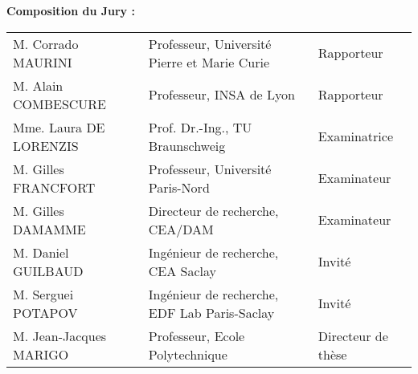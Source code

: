 \begin{titlepage}
\begin{mdframed}
\begin{flushleft}
\textbf{Composition du Jury :}

\vspace{15pt}
\begin{tabular}{@{}lll}
M. Corrado MAURINI & Professeur, Université Pierre et Marie Curie & Rapporteur \\
M. Alain COMBESCURE & Professeur, INSA de Lyon & Rapporteur \\
Mme. Laura DE LORENZIS & Prof. Dr.-Ing., TU Braunschweig & Examinatrice \\
M. Gilles FRANCFORT & Professeur, Université Paris-Nord & Examinateur \\
M. Gilles DAMAMME & Directeur de recherche, CEA/DAM & Examinateur \\
M. Daniel GUILBAUD & Ingénieur de recherche, CEA Saclay & Invité \\
M. Serguei POTAPOV & Ingénieur de recherche, EDF Lab Paris-Saclay & Invité \\
M. Jean-Jacques MARIGO & Professeur, Ecole Polytechnique & Directeur de thèse
\end{tabular}
\end{flushleft}
\end{mdframed}
\end{titlepage}

\titlepage
\setcounter{page}{3}
\restoregeometry